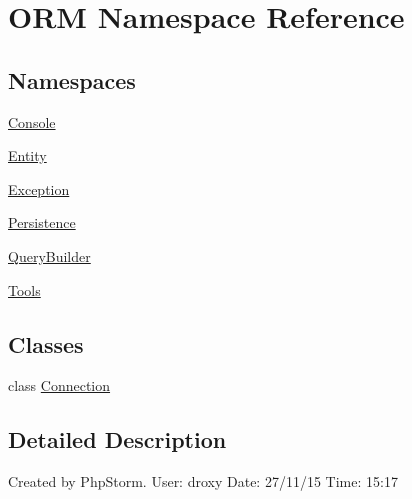 \hypertarget{namespaceORM}{}\section{O\+RM Namespace Reference}
\label{namespaceORM}
\subsection*{Namespaces}
\begin{DoxyCompactItemize}
\item 
 \hyperlink{namespaceORM_1_1Console}{Console}
\item 
 \hyperlink{namespaceORM_1_1Entity}{Entity}
\item 
 \hyperlink{namespaceORM_1_1Exception}{Exception}
\item 
 \hyperlink{namespaceORM_1_1Persistence}{Persistence}
\item 
 \hyperlink{namespaceORM_1_1QueryBuilder}{Query\+Builder}
\item 
 \hyperlink{namespaceORM_1_1Tools}{Tools}
\end{DoxyCompactItemize}
\subsection*{Classes}
\begin{DoxyCompactItemize}
\item 
class \hyperlink{classORM_1_1Connection}{Connection}
\end{DoxyCompactItemize}


\subsection{Detailed Description}
Created by Php\+Storm. User\+: droxy Date\+: 27/11/15 Time\+: 15\+:17 